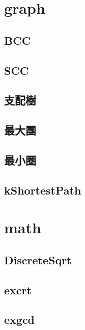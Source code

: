 \documentclass[a4paper,10pt,twocolumn,oneside]{article}
\begin{document}
\section{graph}
    \subsection{BCC}
    

    \subsection{SCC}
    

    \subsection{支配樹}
    

    \subsection{最大團}
    

    \subsection{最小圈}
    

    \subsection{kShortestPath}
    

\section{math}
    \subsection{DiscreteSqrt}
    

    \subsection{excrt}
    

    \subsection{exgcd}
    
\end{document}
